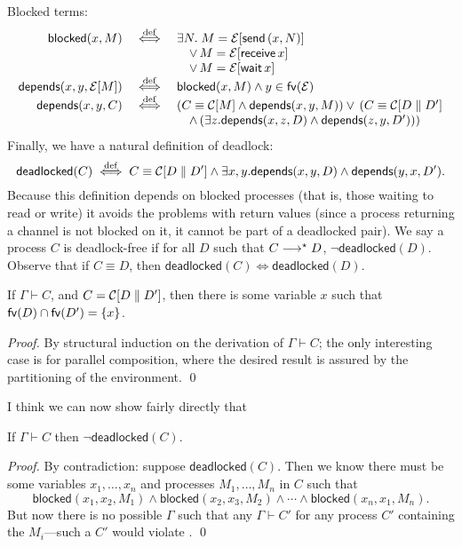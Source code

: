\documentclass[orivec,envcountsame]{llncs}
\begin{document}
Blocked terms:
\newcommand{\blockedp}{\mathsf{blocked}}
\newcommand{\depp}{\mathsf{depends}}
\[\begin{array}{rcl}
  \blockedp(x,M) &\defiff& \exists N. \; M = \Ex[\gvconst{send} \app (x,N)] \\
  && \quad \lor \, M = \Ex[\gvconst{receive} \app x] \\
  && \quad \lor \, M = \Ex[\gvconst{wait} \app x] \\
  \depp(x,y,\Ex[M]) &\defiff& \blockedp(x,M) \land y \in \fv(\Ex) \\
  \depp(x,y,C) &\defiff& (C \equiv \Cx[M] \land \depp(x,y,M)) \lor \, (C \equiv \Cx[D \parallel D'] \\
  && \quad \land \, (\exists z. \depp(x,z,D) \land \depp(z,y,D')))
\end{array}\]
Finally, we have a natural definition of deadlock:
\newcommand{\deadlockp}{\ensuremath{\mathsf{deadlocked}}}
\[
\deadlockp(C) \defiff C \equiv \Cx[D \parallel D'] \land \exists x,y. \depp(x,y,D) \land \depp(y,x,D').
\]
Because this definition depends on blocked processes (that is, those waiting to read or write) it
avoids the problems with return values (since a process returning a channel is not blocked on it, it
cannot be part of a deadlocked pair).  We say a process $C$ is deadlock-free if for all $D$ such
that $C \longrightarrow^\star D$, $\lnot\deadlockp(D)$.  Observe that if $C \equiv D$, then $\deadlockp(C)
\iff \deadlockp(D)$.

\begin{lemma}\label{thm:procs-share-one-channel}
  If $\Gamma \vdash C$, and $C = \mathcal{C}[D \parallel D']$, then there is some variable $x$ such that
  $\mathsf{fv}(D) \cap \mathsf{fv}(D') = \{ x \}$.
\end{lemma}

\begin{proof}
  By structural induction on the derivation of $\Gamma \vdash C$; the only interesting case is for
  parallel composition, where the desired result is assured by the partitioning of the
  environment. \qed
\end{proof}

I think we can now show fairly directly that

\begin{lemma}\label{thm:typed-configs-df}
  If $\Gamma \vdash C$ then $\lnot \deadlockp(C)$.
\end{lemma}

\begin{proof}
  By contradiction: suppose $\deadlockp(C)$.  Then we know there must be some variables
  $x_1,\dots,x_n$ and processes $M_1,\dots,M_n$ in $C$ such that
  \[
    \blockedp(x_1,x_2,M_1) \land \blockedp(x_2,x_3,M_2) \land \cdots \land \blockedp(x_n,x_1,M_n).
  \]
  But now there is no possible $\Gamma$ such that any $\Gamma \vdash C'$ for any process $C'$
  containing the $M_i$---such a $C'$ would violate .  \qed
\end{proof}
\end{document}
